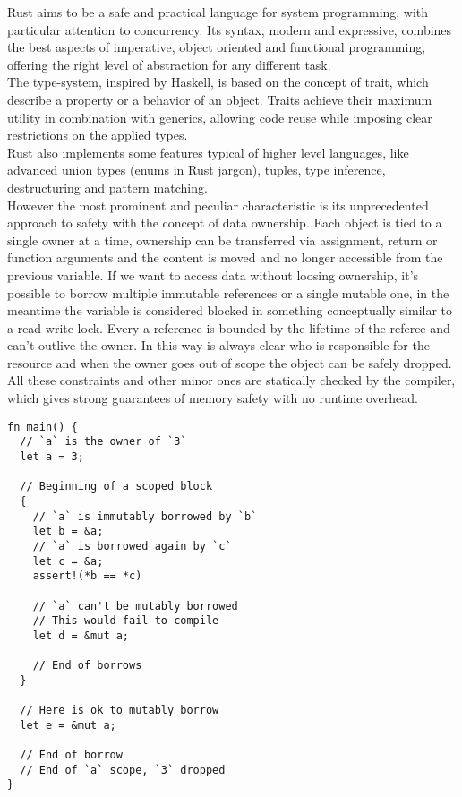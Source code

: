 Rust aims to be a safe and practical language for system programming, with particular attention to concurrency. Its syntax, modern and expressive, combines the best aspects of imperative, object oriented and functional programming, offering the right level of abstraction for any different task.\\
The type-system, inspired by Haskell, is based on the concept of trait, which describe a property or a behavior of an object. Traits achieve their maximum utility in combination with generics, allowing code reuse while imposing clear restrictions on the applied types.\\
Rust also implements some features typical of higher level languages, like advanced union types (enums in Rust jargon), tuples, type inference, destructuring and pattern matching.\\
However the most prominent and peculiar characteristic is its unprecedented approach to safety with the concept of data ownership. Each object is tied to a single owner at a time, ownership can be transferred via assignment, return or function arguments and the content is moved and no longer accessible from the previous variable. If we want to access data without loosing ownership, it's possible to borrow multiple immutable references or a single mutable one, in the meantime the variable is considered blocked in something conceptually similar to a read-write lock. Every a reference is bounded by the lifetime of the referee and can't outlive the owner. In this way is always clear who is responsible for the resource and when the owner goes out of scope the object can be safely dropped.\\
All these constraints and other minor ones are statically checked by the compiler, which gives strong guarantees of memory safety with no runtime overhead.

\begin{minipage}{\textwidth}
\begin{lstlisting}[caption={Example of borrow},label={lst:ownership}]
fn main() {
  // `a` is the owner of `3`
  let a = 3;
  
  // Beginning of a scoped block
  {
    // `a` is immutably borrowed by `b`
    let b = &a;
    // `a` is borrowed again by `c`
    let c = &a;
    assert!(*b == *c)

    // `a` can't be mutably borrowed
    // This would fail to compile
    let d = &mut a;

    // End of borrows
  }

  // Here is ok to mutably borrow
  let e = &mut a;
  
  // End of borrow
  // End of `a` scope, `3` dropped
}
\end{lstlisting}
\end{minipage}\\

